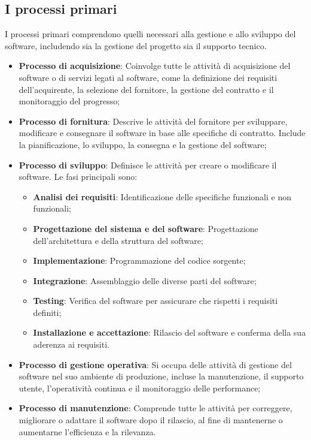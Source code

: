 \subsection{I processi primari}
I processi primari comprendono quelli necessari alla gestione e allo sviluppo del software, includendo sia la gestione del progetto sia il supporto tecnico.
\begin{itemize}
    \item \textbf{Processo di acquisizione}: Coinvolge tutte le attività di acquisizione del software o di servizi legati al software, come la definizione dei requisiti dell'acquirente, la selezione del fornitore, la gestione del contratto e il monitoraggio del progresso;
    \item \textbf{Processo di fornitura}: Descrive le attività del fornitore per sviluppare, modificare e consegnare il software in base alle specifiche di contratto. Include la pianificazione, lo sviluppo, la consegna e la gestione del software;
    \item \textbf{Processo di sviluppo}: Definisce le attività per creare o modificare il software. Le fasi principali sono:
    \begin{itemize}
        \item \textbf{Analisi dei requisiti}: Identificazione delle specifiche funzionali e non funzionali;
        \item \textbf{Progettazione del sistema e del software}: Progettazione dell'architettura e della struttura del software;
        \item \textbf{Implementazione}: Programmazione del codice sorgente;
        \item \textbf{Integrazione}: Assemblaggio delle diverse parti del software;
        \item \textbf{Testing}: Verifica del software per assicurare che rispetti i requisiti definiti;
        \item \textbf{Installazione e accettazione}: Rilascio del software e conferma della sua aderenza ai requisiti.
    \end{itemize}
    \item \textbf{Processo di gestione operativa}: Si occupa delle attività di gestione del software nel suo ambiente di produzione, incluse la manutenzione, il supporto utente, l'operatività continua e il monitoraggio delle performance;
    \item \textbf{Processo di manutenzione}: Comprende tutte le attività per correggere, migliorare o adattare il software dopo il rilascio, al fine di mantenerne o aumentarne l'efficienza e la rilevanza.
\end{itemize}

